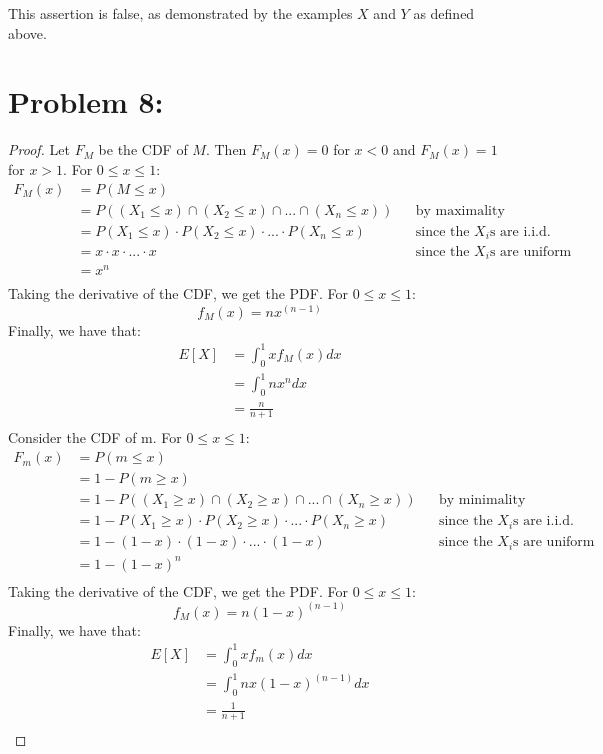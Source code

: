 \documentclass{article}
\begin{document}
This assertion is false, as demonstrated by the examples $X$ and $Y$ as defined above.

\section*{Problem 8:}
\begin{proof}
Let $F_M$ be the CDF of $M$. Then $F_M(x) = 0$ for $x < 0$ and $F_M(x) = 1$ for $x > 1$.  For $0 \le x \le 1$:
\begin{align*}
F_M(x) &= P(M \leq x) \\
&= P((X_1 \leq x) \cap (X_2 \leq x) \cap ... \cap (X_n \leq x)) &&\text{by maximality of M} \\ 
&= P(X_1 \leq x) \cdot P(X_2 \leq x) \cdot ... \cdot P(X_n \leq x) &&\text{since the $X_i$s are i.i.d.} \\
&= x \cdot x \cdot ... \cdot x &&\text{since the $X_i$s are uniform} \\
&= x^n \\
\end{align*}
Taking the derivative of the CDF, we get the PDF. For $0 \le x \le 1$:
$$f_M(x) = nx^{(n - 1)}$$
Finally, we have that:
\begin{align*}
E[X] &= \int_0^1 xf_M(x) dx \\
&= \int_0^1  nx^n dx \\
&= \frac{n}{n + 1} \\
\end{align*}
Consider the CDF of m. For $0 \le x \le 1$:
\begin{align*}
F_m(x) &= P(m \leq x) \\
&= 1 - P(m \geq x) \\
&= 1 - P((X_1 \geq x) \cap (X_2 \geq x) \cap ... \cap (X_n \geq x)) &&\text{by minimality of m} \\
&= 1 - P(X_1 \geq x) \cdot P(X_2 \geq x) \cdot ... \cdot P(X_n \geq x) &&\text{since the $X_i$s are i.i.d.} \\
&= 1 - (1 - x) \cdot (1 - x) \cdot ... \cdot (1 - x) &&\text{since the $X_i$s are uniform} \\
&= 1 - (1 - x)^n \\
\end{align*}
Taking the derivative of the CDF, we get the PDF. For $0 \le x \le 1$:
$$f_M(x) = n(1 - x)^{(n - 1)}$$
Finally, we have that:
\begin{align*}
E[X] &= \int_0^1 xf_m(x) dx \\
&= \int_0^1  nx(1 - x)^{(n - 1)} dx \\
&= \frac{1}{n + 1} \\
\end{align*}

\end{proof}
\end{document}
